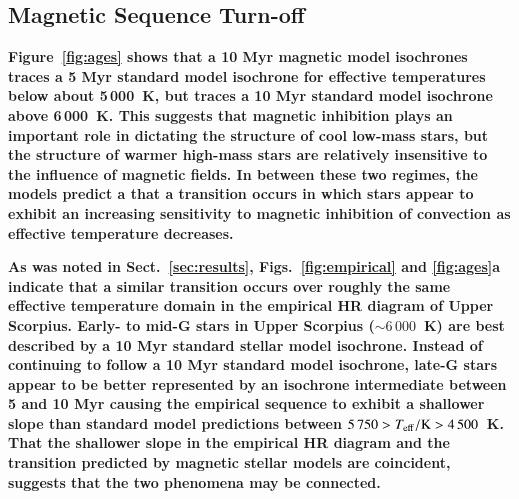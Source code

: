 \documentclass{aa}
\begin{document}
\subsection{Magnetic Sequence Turn-off}
\label{sec:dynamo}

{\bf Figure~\ref{fig:ages} shows that a 10 Myr magnetic model isochrones traces a 5 Myr standard model isochrone for effective temperatures below about 5\,000~K, but traces a 10 Myr standard model isochrone above 6\,000~K. This suggests that magnetic inhibition plays an important role in dictating the structure of cool low-mass stars, but the structure of warmer high-mass stars are relatively insensitive to the influence of magnetic fields. In between these two regimes, the models predict a that a transition occurs in which stars appear to exhibit an increasing sensitivity to magnetic inhibition of convection as effective temperature decreases. }

{\bf As was noted in Sect.~\ref{sec:results}, Figs.~\ref{fig:empirical} and \ref{fig:ages}a indicate that a similar transition occurs over roughly the same effective temperature domain in the empirical HR diagram of Upper Scorpius. Early- to mid-G stars in Upper Scorpius (\teff$ \sim 6\,000$~K) are best described by a 10 Myr standard stellar model isochrone. Instead of continuing to follow a 10 Myr standard model isochrone, late-G stars appear to be better represented by an isochrone intermediate between 5 and 10 Myr causing the empirical sequence to exhibit a shallower slope than standard model predictions between $5\,750 > T_{\rm eff} / {\rm K} > 4\,500$~K. 
That the shallower slope in the empirical HR diagram and the transition predicted by magnetic stellar models are coincident, suggests that the two phenomena may be connected.
}
\end{document}
